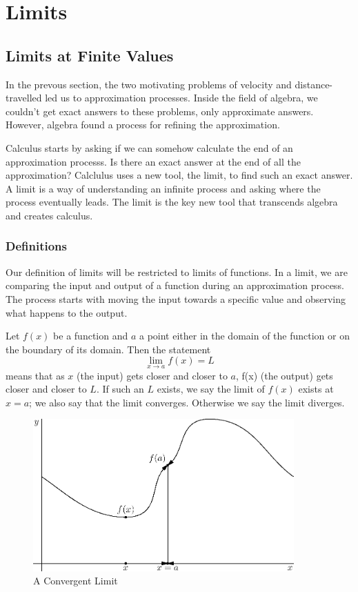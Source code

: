 \documentclass[fleqn]{report}
\begin{document}
\chapter{Limits}
\label{limits}

\section{Limits at Finite Values}
\label{finite-values}

In the prevous section, the two motivating problems of
velocity and distance-travelled led us to approximation
processes. Inside the field of algebra, we couldn't get exact
answers to these problems, only approximate answers. 
However, algebra found a process for refining the approximation. 

Calculus starts by asking if we can somehow calculate the end
of an approximation processs. Is there an exact answer at the
end of all the approximation? Calclulus uses a new tool, the
limit, to find such an exact answer. A limit is a way of
understanding an infinite process and asking where the process
eventually leads.  The limit is the key new tool that
transcends algebra and creates calculus.

\subsection{Definitions}
\label{limit-definitions}

Our definition of limits will be restricted to limits of
functions. In a limit, we are comparing the input and output
of a function during an approximation process. The process
starts with moving the input towards a specific value and
observing what happens to the output.

Let $f(x)$ be a function and $a$ a point either in the domain
of the function or on the boundary of its domain. Then the
statement 
\begin{equation*}
\lim_{x \rightarrow a} f(x) = L
\end{equation*}
means that as $x$ (the input) gets closer and closer to $a$,
f(x) (the output) gets closer and closer to $L$. If such an
$L$ exists, we say the limit of $f(x)$ exists at $x=a$; we
also say that the limit converges. Otherwise we say the limit
diverges. 

\begin{figure}[t]
\centering
\includegraphics[width=10cm]{figure18.eps}
\caption{A Convergent Limit}
\label{figure-convergent-limit}
\end{figure}
\end{document}
